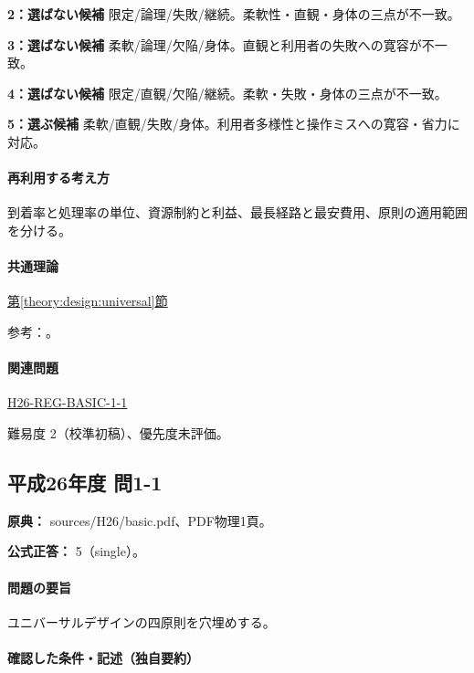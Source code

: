 \noindent\textbf{2：選ばない候補} 限定/論理/失敗/継続。柔軟性・直観・身体の三点が不一致。\par

\noindent\textbf{3：選ばない候補} 柔軟/論理/欠陥/身体。直観と利用者の失敗への寛容が不一致。\par

\noindent\textbf{4：選ばない候補} 限定/直観/欠陥/継続。柔軟・失敗・身体の三点が不一致。\par

\noindent\textbf{5：選ぶ候補} 柔軟/直観/失敗/身体。利用者多様性と操作ミスへの寛容・省力に対応。\par

\paragraph{再利用する考え方} 到着率と処理率の単位、資源制約と利益、最長経路と最安費用、原則の適用範囲を分ける。

\paragraph{共通理論} \hyperref[theory:design:universal]{第\ref*{theory:design:universal}節}

\par 参考：\cite{design48_ud}。

\paragraph{関連問題} \hyperref[q:h26-reg-basic-1-1]{H26-REG-BASIC-1-1}

\par 難易度 2（校準初稿）、優先度未評価。

\subsection{平成26年度 問1-1}
\label{q:h26-reg-basic-1-1}

\noindent\textbf{原典：} sources/H26/basic.pdf、PDF物理1頁。

\textbf{公式正答：} 5（single）。

\paragraph{問題の要旨} ユニバーサルデザインの四原則を穴埋めする。

\paragraph{確認した条件・記述（独自要約）}\mbox{}\par

